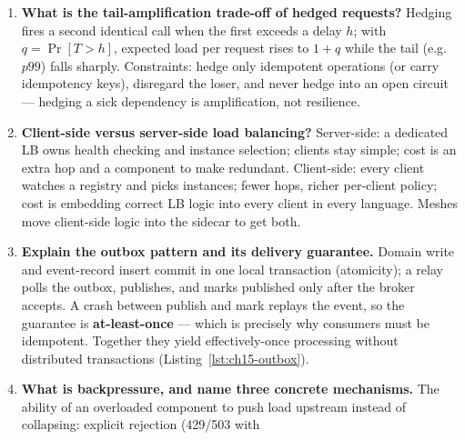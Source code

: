 \begin{enumerate}[label=\textbf{Q\arabic*.}, leftmargin=1.6cm, start=11]
        Work backward from the SLO and volume. Baseline failure rate is
        $0.1\%$; set $\theta = 0.5$ so the breaker opens only when failure
        is unambiguously systemic, not at SLO noise. Window $W = 10$ s
        covers $\approx 5{,}000$ calls; set $N = 20$ (a floor far below
        normal volume so statistics are meaningful, far above noise). Open
        duration $d = 5$--$30$ s, tuned to the dependency's observed
        recovery time. Probes: $p = 1$--$3$ concurrent, $s = 3$ consecutive
        successes --- recovery is when probes succeed repeatedly, not once.
        Validate every number with the chaos drill, not with hope.
  \item \textbf{What is the tail-amplification trade-off of hedged
        requests?}
        Hedging fires a second identical call when the first exceeds a
        delay $h$; with $q = \Pr[T > h]$, expected load per request rises
        to $1 + q$ while the tail (e.g.\ $p99$) falls sharply. Constraints:
        hedge only idempotent operations (or carry idempotency keys),
        disregard the loser, and never hedge into an open circuit ---
        hedging a sick dependency is amplification, not resilience.
  \item \textbf{Client-side versus server-side load balancing?}
        Server-side: a dedicated LB owns health checking and instance
        selection; clients stay simple; cost is an extra hop and a
        component to make redundant. Client-side: every client watches a
        registry and picks instances; fewer hops, richer per-client policy;
        cost is embedding correct LB logic into every client in every
        language. Meshes move client-side logic into the sidecar to get
        both.
  \item \textbf{Explain the outbox pattern and its delivery guarantee.}
        Domain write and event-record insert commit in one local
        transaction (atomicity); a relay polls the outbox, publishes, and
        marks published only after the broker accepts. A crash between
        publish and mark replays the event, so the guarantee is
        \textbf{at-least-once} --- which is precisely why consumers must be
        idempotent. Together they yield effectively-once processing without
        distributed transactions (Listing~\ref{lst:ch15-outbox}).
  \item \textbf{What is backpressure, and name three concrete mechanisms.}
        The ability of an overloaded component to push load upstream
        instead of collapsing: explicit rejection (429/503 with

\end{enumerate}
